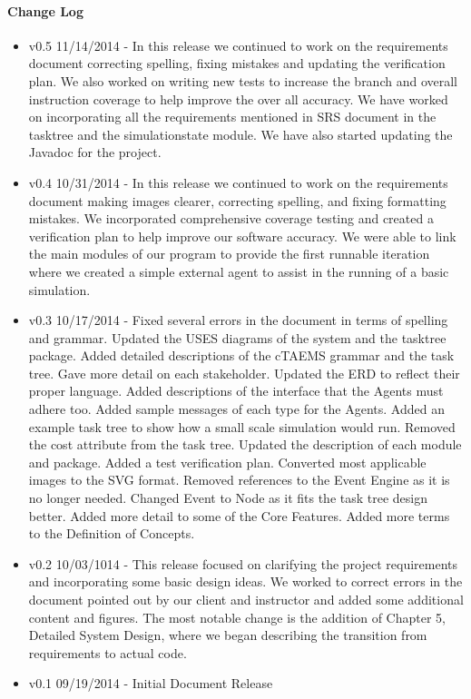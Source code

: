 \paragraph{Change Log}
\begin{itemize}
\item v0.5 11/14/2014 - In this release we continued to work on the requirements document correcting spelling, fixing mistakes and updating the verification plan. We also worked on writing new tests to increase the branch and overall instruction coverage to help improve the over all accuracy. We have worked on incorporating all the requirements mentioned in SRS document in the tasktree and the simulationstate module. We have also started updating the Javadoc for the project.
\item v0.4 10/31/2014 - In this release we continued to work on the requirements
document making images clearer, correcting spelling, and fixing formatting mistakes. We incorporated comprehensive coverage testing and created a verification plan to help improve our software accuracy. We were able to link the main modules of our program to provide the first runnable iteration where we created a simple external agent to assist in the running of a basic simulation. 
\item v0.3 10/17/2014 - Fixed several errors in the document in terms
of spelling and grammar. Updated the USES diagrams of the system and the tasktree package. Added detailed descriptions of the cTAEMS grammar and the task tree. Gave more detail on each stakeholder. Updated the ERD to reflect their proper language. Added descriptions of the interface that the Agents must adhere too. Added sample messages of each type for the Agents. Added an example task tree to show how a small scale simulation would run. Removed the cost attribute from the task tree. Updated the description of each module and package. Added a test verification plan. Converted most applicable images to the SVG format. Removed references to the Event Engine as it is no longer needed. Changed Event to Node as it fits the task tree design better. Added more detail to some of the Core Features. Added more terms to the Definition of Concepts.
\item v0.2 10/03/1014 - This release focused on clarifying the project
requirements and incorporating some basic design ideas. We worked to correct errors in the document pointed out by our client and instructor and added some additional content and figures. The most notable change is the addition of Chapter 5, Detailed System Design, where we began describing the transition from requirements to actual code.
\item v0.1 09/19/2014 - Initial Document Release
\end{itemize}



